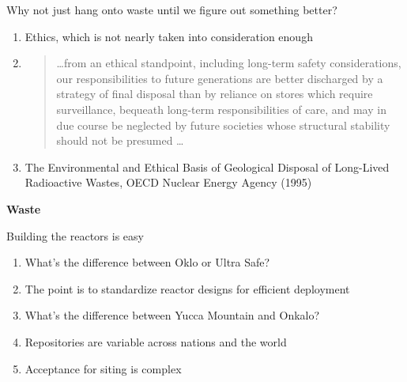 \documentclass[aspectratio=1610,pdftex,dvipsnames,compress,xcolor={dvipsnames}]{beamer}
\begin{document}
\begin{frame}{Why not just hang onto waste until we figure out something better?}
    \begin{enumerate}[series=outerlist,topsep=0pt,itemsep=21pt,leftmargin=*,label=(\arabic*)]
        \item[]Ethics, which is not nearly taken into consideration enough
        \item[]
            \begin{quote}
                \ldots from an ethical standpoint, including long-term safety considerations, our responsibilities to future generations are better discharged by a strategy of final disposal than by reliance on stores which require surveillance, bequeath long-term responsibilities of care, and may in due course be neglected by future societies whose
structural stability should not be presumed \ldots
            \end{quote}
        \item[]The Environmental and Ethical Basis of Geological Disposal of Long-Lived Radioactive Wastes, OECD Nuclear Energy Agency (1995)
    \end{enumerate}
\end{frame}


\begin{frame}[plain]{}
    \centering\LARGE\textbf{Waste}
\end{frame}


\addtocounter{framenumber}{-1} 
\begin{frame}{Building the reactors is easy}
    \begin{enumerate}[series=outerlist,topsep=0pt,itemsep=21pt,leftmargin=*,label=(\arabic*)]
        \item[]What's the difference between Oklo or Ultra Safe?
        \item[]The point is to standardize reactor designs for efficient deployment
        \item[]What's the difference between Yucca Mountain and Onkalo?
        \item[]Repositories are variable across nations and the world
        \item[]Acceptance for siting is complex
    \end{enumerate}
\end{frame}
\end{document}
